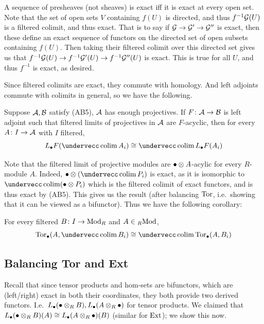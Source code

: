     A sequence of presheaves (not sheaves) is exact iff it is exact at every open set.
    Note that the set of open sets $V$ containing $f(U)$ is directed, and thus $f^{-1}{{\cal G}}(U)$ is a filtered colimit, and thus exact.
    That is to say if ${{\cal G}}\to{{\cal G}}'\to{{\cal G}}''$ is exact, then these define an exact sequence of functors on the directed set of open subsets containing $f(U)$.
    Then taking their filtered colimit over this directed set gives us that $f^{-1}{{\cal G}}(U)\to f^{-1}{{\cal G}}'(U)\to f^{-1}{{\cal G}}''(U)$ is exact.
    This is true for all $U$, and thus $f^{-1}$ is exact, as desired.

\eexam

Since filtered colimits are exact, they commute with homology.
And left adjoints commute with colimits in general, so we have the following.

\bthrm

    Suppose ${{\cal A}},{{\cal B}}$ satisfy (AB5), ${{\cal A}}$ has enough projectives.
    If $F\colon{{\cal A}}\to{{\cal B}}$ is left adjoint such that filtered limits of projectives in ${{\cal A}}$ are $F$-acyclic, then for every $A\colon I\to{{\cal A}}$ with $I$ filtered,
    $$ L_\bul F(\coflim A_i) \cong \coflim L_\bul F(A_i) $$

\ethrm

Note that the filtered limit of projective modules are $\bullet\otimes A$-acylic for every $R$-module $A$.
Indeed, $\bul\otimes(\coflim P_i)$ is exact, as it is isomorphic to $\coflim(\bul\otimes P_i)$ which is the filtered colimit of exact functors, and is thus exact by (AB5).
This gives us the result (after balancing ${\rm Tor}$, i.e.\ showing that it can be viewed as a bifunctor).
Thus we have the following corollary:

\bcoro

    For every filtered $B\colon I\to{\rm Mod}_R$ and $A\in{}_R{\rm Mod}$,
    $$ \tor_\bul(A,\coflim B_i) \cong \coflim \tor_\bul(A,B_i) $$

\ecoro

\subsection{Balancing Tor and Ext}

Recall that since tensor products and hom-sets are bifunctors, which are (left/right) exact in both their coordinates, they both provide two derived functors.
I.e.\ $L_\bullet(\bullet\otimes_RB),L_\bullet(A\otimes_R\bullet)$ for tensor products.
We claimed that $L_\bullet(\bullet\otimes_RB)(A)\cong L_\bullet(A\otimes_R\bullet)(B)$ (similar for ${\rm Ext}$); we show this now.

